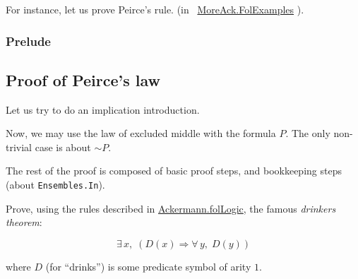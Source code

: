 For instance, let us prove Peirce's rule.
 (in  ~\href{../theories/html/hydras.MoreAck.FolExamples.html}{MoreAck.FolExamples} ).

\subsubsection{Prelude}



\subsection{Proof of Peirce's law}



Let us try to do an implication introduction.


Now, we may use the law of excluded middle with the formula $P$. The only non-trivial case is about $\sim P$.


The rest of the proof is composed of basic proof steps, 
and bookkeeping steps (about \texttt{Ensembles.In}).


\begin{exercise}
Prove, using the rules described in 
 \href{../theories/html/hydras.Ackermann.folLogic.html}{Ackermann.folLogic}, the famous \emph{drinkers theorem}:

$$\exists\,x,\; (D(x)\Longrightarrow \forall\,y,\; D(y))$$
\end{exercise}

where $D$ (for ``drinks'') is some predicate symbol of arity $1$.


